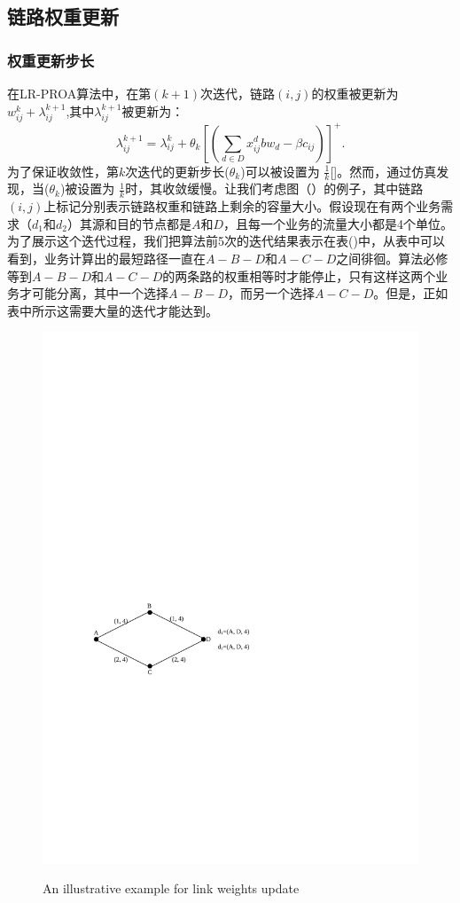 \subsection{链路权重更新}
\subsubsection{权重更新步长}
  在LR-PROA算法中，在第$(k+1)$次迭代，链路$(i,j)$的权重被更新为$w_{ij}^{k} + \lambda_{ij}^{k+1}$,其中$\lambda_{ij}^{k+1}$被更新为：
\begin{equation}\label{Iter}
  \lambda_{ij}^{k+1} = \lambda_{ij}^k + \theta_k[(\sum\limits_{d \in D}x_{ij}^dbw_d - \beta c_{ij})]^+.
\end{equation}
  为了保证收敛性，第$k$次迭代的更新步长($\theta_k$)可以被设置为 $\frac{1}{k}$[]。然而，通过仿真发现，当($\theta_k$)被设置为 $\frac{1}{k}$时，其收敛缓慢。让我们考虑图（）的例子，其中链路$(i,j)$上标记分别表示链路权重和链路上剩余的容量大小。假设现在有两个业务需求（$d_1$和$d_2$）其源和目的节点都是$A$和$D$，且每一个业务的流量大小都是4个单位。为了展示这个迭代过程，我们把算法前5次的迭代结果表示在表()中，从表中可以看到，业务计算出的最短路径一直在$A-B-D$和$A-C-D$之间徘徊。算法必修等到$A-B-D$和$A-C-D$的两条路的权重相等时才能停止，只有这样这两个业务才可能分离，其中一个选择$A-B-D$，而另一个选择$A-C-D$。但是，正如表中所示这需要大量的迭代才能达到。
\begin{figure}
\setlength{\belowcaptionskip}{-0.1cm}
  \begin{center}
    {\includegraphics[width=0.4 \textwidth]{figures/IterNum.pdf}}
    \end{center}
  \caption{{\footnotesize{An illustrative example for link weights update}}}
  \label{IterNum}
\end{figure}
